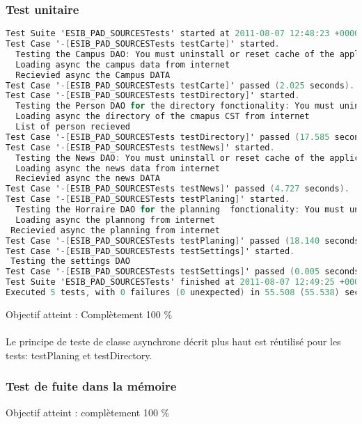		 		 \subsubsection*{Test unitaire}
		 		 \begin{lstlisting}[language=C,caption = Log des test unitaires]
Test Suite 'ESIB_PAD_SOURCESTests' started at 2011-08-07 12:48:23 +0000
Test Case '-[ESIB_PAD_SOURCESTests testCarte]' started.
  Testing the Campus DAO: You must uninstall or reset cache of the application before testing
  Loading async the campus data from internet
  Recievied async the Campus DATA
Test Case '-[ESIB_PAD_SOURCESTests testCarte]' passed (2.025 seconds).
Test Case '-[ESIB_PAD_SOURCESTests testDirectory]' started.
  Testing the Person DAO for the directory fonctionality: You must uninstall or reset cache of the application before testing
  Loading async the directory of the cmapus CST from internet
  List of person recieved
Test Case '-[ESIB_PAD_SOURCESTests testDirectory]' passed (17.585 seconds).
Test Case '-[ESIB_PAD_SOURCESTests testNews]' started.
  Testing the News DAO: You must uninstall or reset cache of the application before testing
  Loading async the news data from internet
  Recievied async the news DATA
Test Case '-[ESIB_PAD_SOURCESTests testNews]' passed (4.727 seconds).
Test Case '-[ESIB_PAD_SOURCESTests testPlaning]' started.
  Testing the Horraire DAO for the planning  fonctionality: You must uninstall or reset cache of the application before testing
  Loading async the plannong from internet
 Recievied async the planning from internet
Test Case '-[ESIB_PAD_SOURCESTests testPlaning]' passed (18.140 seconds).
Test Case '-[ESIB_PAD_SOURCESTests testSettings]' started.
 Testing the settings DAO
Test Case '-[ESIB_PAD_SOURCESTests testSettings]' passed (0.005 seconds).
Test Suite 'ESIB_PAD_SOURCESTests' finished at 2011-08-07 12:49:25 +0000.
Executed 5 tests, with 0 failures (0 unexpected) in 55.508 (55.538) seconds
		 		 \end{lstlisting}
		 		Objectif atteint : {\color{green}Complètement 100 \% \CheckedBox}\\
		 		\\
		 		Le principe de teste de classe asynchrone décrit plus haut est réutilisé pour les tests: testPlaning et testDirectory.
		 		 \subsubsection*{Test de fuite dans la mémoire}
		 		 Objectif atteint : {\color{green}complètement 100 \% \CheckedBox}\\
